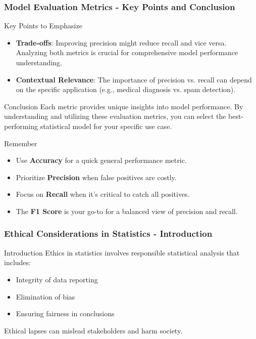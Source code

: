 \documentclass{beamer}
\begin{document}
\begin{frame}[fragile]
    \frametitle{Model Evaluation Metrics - Key Points and Conclusion}
    \begin{block}{Key Points to Emphasize}
        \begin{itemize}
            \item \textbf{Trade-offs}: Improving precision might reduce recall and vice versa. Analyzing both metrics is crucial for comprehensive model performance understanding.
            \item \textbf{Contextual Relevance}: The importance of precision vs. recall can depend on the specific application (e.g., medical diagnosis vs. spam detection).
        \end{itemize}
    \end{block}

    \begin{block}{Conclusion}
        Each metric provides unique insights into model performance. By understanding and utilizing these evaluation metrics, you can select the best-performing statistical model for your specific use case.
    \end{block}

    \begin{block}{Remember}
        \begin{itemize}
            \item Use \textbf{Accuracy} for a quick general performance metric.
            \item Prioritize \textbf{Precision} when false positives are costly.
            \item Focus on \textbf{Recall} when it's critical to catch all positives.
            \item The \textbf{F1 Score} is your go-to for a balanced view of precision and recall.
        \end{itemize}
    \end{block}
\end{frame}

\begin{frame}[fragile]
    \frametitle{Ethical Considerations in Statistics - Introduction}
    \begin{block}{Introduction}
        Ethics in statistics involves responsible statistical analysis that includes:
        \begin{itemize}
            \item Integrity of data reporting
            \item Elimination of bias
            \item Ensuring fairness in conclusions
        \end{itemize}
        Ethical lapses can mislead stakeholders and harm society.
    \end{block}
\end{frame}
\end{document}
